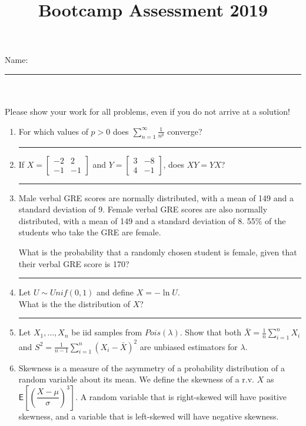 \documentclass[12pt]{article}
\title{\vspace{-2ex}Bootcamp Assessment 2019\vspace{-3ex}}
\date{\vspace{-2ex}}
\begin{document}
\maketitle
\noindent Name: \rule{6cm}{.01cm} \\ \\
Please show your work for all problems, even if you do not arrive at a solution!
\begin{enumerate}
\item For which values of $p > 0$ does $\sum_{n=1}^\infty \frac{1}{n^p}$ converge? \rule{5cm}{.01cm} %
    \vfill
    
\item If $X = \begin{bmatrix}-2 & 2 \\ -1 & -1 \end{bmatrix}$ and $Y = \begin{bmatrix} 3 & -8 \\ 4 & -1 \end{bmatrix}$, does $XY = YX$? \rule{5cm}{.01cm} %
    \vfill
\pagebreak

\item Male verbal GRE scores are normally distributed, with a mean of 149 and a standard deviation of 9. Female verbal GRE scores are also normally distributed, with a mean of 149 and a standard deviation of 8. 55\% of the students who take the GRE are female.

What is the probability that a randomly chosen student is female, given that their verbal GRE score is 170? \rule{6cm}{.01cm} %
    \vfill 
    
\item Let $U \sim Unif(0,1)$ and define $X = -\ln U$.\\
What is the the distribution of $X$? \rule{6cm}{.01cm} %
\vfill 
\pagebreak 

\item Let $X_1,\ldots,X_n$ be iid samples from $Pois(\lambda)$. Show that both $\bar{X} = \frac{1}{n}\sum_{i=1}^n X_i$ and $S^2 = \frac{1}{n-1}\sum_{i=1}^n(X_i - \bar{X})^2$ are unbiased estimators for $\lambda$.
\pagebreak 

\item Skewness is a measure of the asymmetry of a probability distribution of a random variable about its mean. We define the skewness of a r.v. $X$ as $\mathsf{E}\left[\left(\dfrac{X-\mu}{\sigma}\right)^3\right]$. A random variable that is right-skewed will have positive skewness, and a variable that is left-skewed will have negative skewness.\\
    

\end{enumerate}
\end{document}
